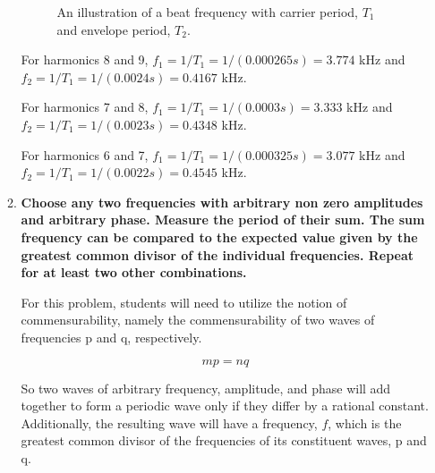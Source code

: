 \begin{enumerate}[resume]
\begin{enumerate}[label=(\Alph*)]
\begin{figure}
\caption{An illustration of a beat frequency with carrier period, $T_1$ and envelope period, $T_2$.}
\label{fig:fscg3}
\end{figure}

For harmonics 8 and 9, $f_1=1/T_1=1/(0.000265s)=3.774$ kHz and $f_2=1/T_1=1/(0.0024s)=0.4167$ kHz.\vspace{5mm}

For harmonics 7 and 8, $f_1=1/T_1=1/(0.0003s)=3.333$ kHz and $f_2=1/T_1=1/(0.0023s)=0.4348$ kHz.\vspace{5mm}

For harmonics 6 and 7, $f_1=1/T_1=1/(0.000325s)=3.077$ kHz and $f_2=1/T_1=1/(0.0022s)=0.4545$ kHz.\vspace{5mm}

\item {\bf Choose any two frequencies with arbitrary non zero amplitudes and arbitrary phase. Measure the period of their sum. The sum frequency can be compared to the expected value given by the greatest common divisor of the individual frequencies. Repeat for at least two other combinations.}\newline

For this problem, students will need to utilize the notion of commensurability, namely the commensurability of two waves of frequencies p and q, respectively.

\begin{equation}
mp=nq
\label{equ:fscg11}
\end{equation}

So two waves of arbitrary frequency, amplitude, and phase will add together to form a periodic wave only if they differ by a rational constant. Additionally, the resulting wave will have a frequency, $f$, which is the greatest common divisor of the frequencies of its constituent waves, p and q.\newline


\end{enumerate}
\end{enumerate}

